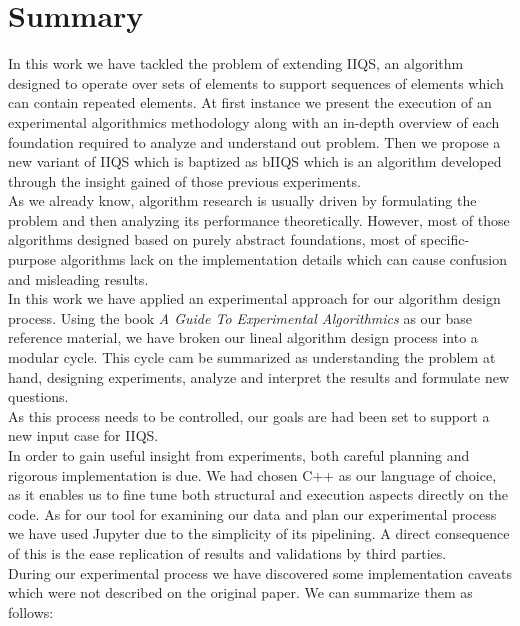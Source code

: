 \chapter{Summary}
\label{CHAPTER:SUMMARY}

In this work we have tackled the problem of extending IIQS, an algorithm designed to operate over sets of elements to support sequences of elements which can contain repeated elements. At first instance we present the execution of an experimental algorithmics methodology along with an in-depth overview of each foundation required to analyze and understand out problem. Then we propose a new variant of IIQS which is baptized as bIIQS which is an algorithm developed through the insight gained of those previous experiments.\\

As we already know, algorithm research is usually driven by formulating the problem and then analyzing its performance theoretically. However, most of those algorithms designed based on purely abstract foundations, most of specific-purpose algorithms lack on the implementation details which can cause confusion and misleading results.\\

In this work we have applied an experimental approach for our algorithm design process. Using the book \emph{A Guide To Experimental Algorithmics}\cite{10.5555/2159557} as our base reference material, we have broken our lineal algorithm design process into a modular cycle. This cycle cam be summarized as understanding the problem at hand, designing experiments, analyze and interpret the results and formulate new questions.\\

As this process needs to be controlled, our goals are had been set to support a new input case for IIQS.\\

In order to gain useful insight from experiments, both careful planning and rigorous implementation is due. We had chosen C++ as our language of choice, as it enables us to fine tune both structural and execution aspects directly on the code. As for our tool for examining our data and plan our experimental process we have used Jupyter due to the simplicity of its pipelining. A direct consequence of this is the ease replication of results and validations by third parties.\\

During our experimental process we have discovered some implementation caveats which were not described on the original paper. We can summarize them as follows:


